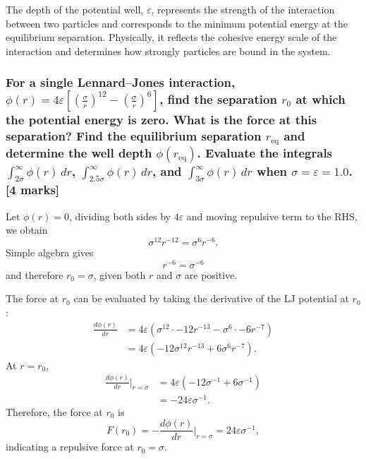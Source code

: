 \documentclass[a4paper,10pt,twocolumn]{article}
\begin{document}
The depth of the potential well, $\varepsilon$, represents the strength of the interaction between two particles and corresponds to the minimum potential energy at the equilibrium separation. Physically, it reflects the cohesive energy scale of the interaction and determines how strongly particles are bound in the system.

\subsubsection*{For a single Lennard--Jones interaction, $\phi(r)=4\varepsilon\left[\left(\frac{\sigma}{r}\right)^{12}-\left(\frac{\sigma}{r}\right)^6\right]$, find the separation $r_0$ at which the potential energy is zero. What is the force at this separation? Find the equilibrium separation $r_{\mathrm{eq}}$ and determine the well depth $\phi(r_{\mathrm{eq}})$. Evaluate the integrals $\int_{2\sigma}^{\infty}\phi(r)\,dr$, $\int_{2.5\sigma}^{\infty}\phi(r)\,dr$, and $\int_{3\sigma}^{\infty}\phi(r)\,dr$ when $\sigma=\varepsilon=1.0$.
[4 marks]}

Let $\phi(r)=0$, dividing both sides by $4\varepsilon$ and moving repulsive term to the RHS, we obtain
\[
\sigma^{12}{r}^{-12}=\sigma^{6}{r}^{-6}.
\]
Simple algebra gives
\[
r^{-6}=\sigma^{-6}
\]
and therefore $r_0=\sigma$, given both $r$ and $\sigma$ are positive.

The force at $r_0$ can be evaluated by taking the derivative of the LJ potential at $r_0$:
\begin{align*}
\frac{d\phi(r)}{d r}
&= 4\varepsilon\left(\sigma^{12}\cdot -12r^{-13}-\sigma^{6}\cdot -6r^{-7} \right)
\\
&= 4\varepsilon\left(-12\sigma^{12}r^{-13}+6\sigma^{6}r^{-7} \right).
\end{align*}
At $r=r_0$,
\begin{align*}
\frac{d\phi(r)}{d r}\Big|_{r=\sigma}
&= 4\varepsilon\left(-12\sigma^{-1}+6\sigma^{-1} \right)
\\
&= -24\varepsilon\sigma^{-1}.
\end{align*}
Therefore, the force at $r_0$ is 
\[
F(r_0)=-\frac{d\phi(r)}{d r}\Big|_{r=\sigma}=24\varepsilon\sigma^{-1},
\]
indicating a repulsive force at $r_0=\sigma$.
\end{document}
